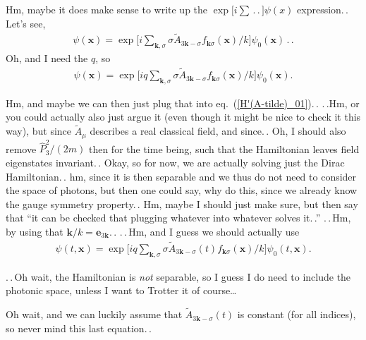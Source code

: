 \documentclass{report}
\begin{document}
Hm, maybe it does make sense to write up the $\exp\big[i\sum \,.\,.\,\big] \psi(x)$ expression.\,. Let's see, 
\begin{align}
	\psi(\boldsymbol{x})=\exp\Big[
		i\sum_{\boldsymbol{k}, \sigma} \sigma \tilde A_{3\boldsymbol{k}-\sigma} 
		f_{\boldsymbol{k}\sigma}(\boldsymbol{x}) / k
	\Big] \psi_0(\boldsymbol{x})\,.\,.
\end{align}
Oh, and I need the $q$, so
\begin{align}
	\psi(\boldsymbol{x})=\exp\Big[
		i q \sum_{\boldsymbol{k}, \sigma} \sigma \tilde A_{3\boldsymbol{k}-\sigma} 
		f_{\boldsymbol{k}\sigma}(\boldsymbol{x}) / k
	\Big] \psi_0(\boldsymbol{x}).
\end{align}

Hm, and maybe we can then just plug that into eq.\ (\ref{H'(A-tilde)_01}).\,. .\,.Hm, or you could actually also just argue it (even though it might be nice to check it this way), but since $\tilde A_\mu$ describes a real classical field, and since.\,. Oh, I should also remove $\hat P_3^2/(2m)$ then for the time being, such that the Hamiltonian leaves field eigenstates invariant.\,. Okay, so for now, we are actually solving just the Dirac Hamiltonian.\,. hm, since it is then separable and we thus do not need to consider the space of photons, but then one could say, why do this, since we already know the gauge symmetry property.\,. Hm, maybe I should just make sure, but then say that ``it can be checked that plugging whatever into whatever solves it.\,.'' .\,.\,Hm, by using that $\boldsymbol{k}/k=\boldsymbol{e}_{3\boldsymbol{k}}$.\,. 
.\,.\,Hm, and I guess we should actually use
\begin{align}
	\psi(t, \boldsymbol{x})=\exp\Big[
		i q \sum_{\boldsymbol{k}, \sigma} \sigma \tilde A_{3\boldsymbol{k}-\sigma}(t) 
		f_{\boldsymbol{k}\sigma}(\boldsymbol{x}) / k
	\Big] \psi_0(t, \boldsymbol{x}).
\end{align}

.\,.\,Oh wait, the Hamiltonian is \emph{not} separable, so I guess I do need to include the photonic space, unless I want to Trotter it of course\ldots\ 

Oh wait, and we can luckily assume that $\tilde A_{3\boldsymbol{k}-\sigma}(t)$ is constant (for all indices), so never mind this last equation.\,. 
\end{document}
